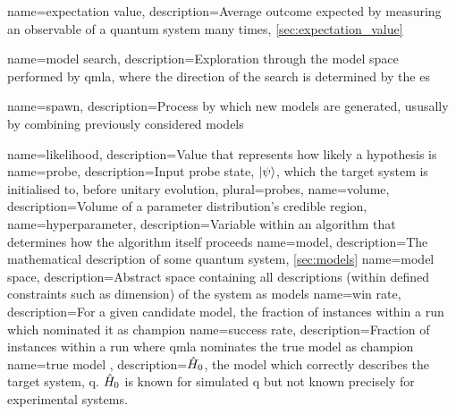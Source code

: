 



{
    name=expectation value,
    description={Average outcome expected by measuring an observable of a quantum system many times, \cref{sec:expectation_value}}
}

{
    name=model search,
    description={Exploration through the \gls{model space} performed by \gls{qmla}, where the direction of the search is determined by the \gls{es}}
}

{
    name=spawn,
    description={Process by which new models are generated, ususally by combining previously considered models}
}

{
    name=likelihood,
    description={Value that represents how likely a hypothesis is}
}
{
    name=probe,
    description={Input \gls{probe} state, $\ket{\psi}$, which the target system is initialised to, before unitary evolution},
    plural={probes},
}
{
    name=volume,
    description={Volume of a parameter distribution's credible region, \label{sec:volume}}
}
{
    name=hyperparameter,
    description={Variable within an algorithm that determines how the algorithm itself proceeds}
}
{
    name=model,
    description={The mathematical description of some quantum system, \cref{sec:models}}
}
{
    name=model space,
    description={Abstract space containing all descriptions (within defined constraints such as dimension) of the system as models}
}
{
    name=win rate,
    description={For a given candidate model, the fraction of \glspl{instance} within a \gls{run} which nominated it as champion}
}
{
    name=success rate,
    description={Fraction of \glspl{instance} within a \gls{run} where \gls{qmla} nominates the \gls{true model} as \gls{champion}}
}
{
    name={true model} ,
    description={$\hat{H}_0$, the model which correctly describes the target system, \gls{q}. $\hat{H}_0$ is known for simulated \gls{q} 
    but not known precisely for experimental systems.}
}

